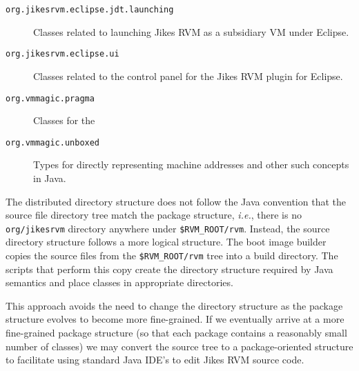 \begin{description}
\item[\texttt{org.jikesrvm.eclipse.jdt.launching}] Classes related
to launching Jikes RVM as a subsidiary VM under Eclipse. 

\item[\texttt{org.jikesrvm.eclipse.ui}] Classes related
to the control panel for the Jikes RVM plugin for Eclipse.

\item[\texttt{org.vmmagic.pragma}] Classes for the 


\item[\texttt{org.vmmagic.unboxed}] Types for directly representing
machine addresses and other such concepts in Java.


\end{description}

The distributed directory structure
does not follow the Java\TMweb{} convention that the source file directory tree
match the package structure, {\it i.e.},
there is no {\tt org/jikesrvm} directory anywhere under \texttt{\$RVM\_ROOT/rvm}.  Instead, the source directory structure follows a more logical 
structure.  The boot image builder
copies the source files from the \texttt{\$RVM\_ROOT/rvm} tree into a build
directory.  The scripts that perform this copy create the directory
structure required by Java semantics and place classes in appropriate
directories.

This approach avoids the need to change the directory structure as the
package structure evolves to become more fine-grained. If we
eventually arrive at a more fine-grained package structure (so that
each package contains a reasonably small number of classes) we may
convert the source tree to a package-oriented structure to facilitate
using standard Java IDE's to edit Jikes RVM source code.
